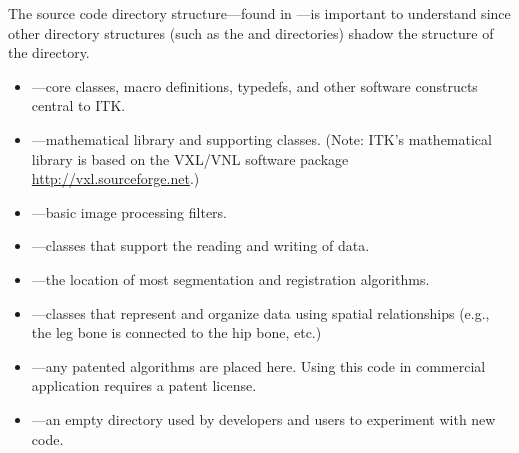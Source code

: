 The source code directory structure---found in ---is 
important to understand since other directory structures (such as the
 and  directories) shadow the structure of the
 directory.
\begin{itemize}
        \item {}---core classes, macro definitions,
        typedefs, and other software constructs central to ITK.
        \item {}---mathematical library and
        supporting classes. (Note: ITK's mathematical library is based
        on the VXL/VNL software package \url{http://vxl.sourceforge.net}.)
        \item {}---basic image processing
        filters.
        \item {}---classes that support the reading
        and writing of data.
        \item {}---the location of most 
        segmentation and registration algorithms.
        \item {}---classes that represent
        and organize data using spatial relationships (e.g., the leg bone
        is connected to the hip bone, etc.)
        \item {}---any patented algorithms are
        placed here. Using this code in commercial application requires
        a patent license.
        \item {}---an empty directory used by developers
        and users to experiment with new code.
\end{itemize}


